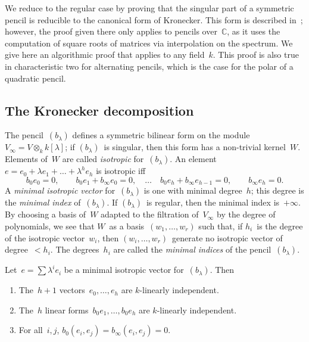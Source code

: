 \documentclass{article}%
\begin{document}
We reduce to the regular case by proving that the singular part of a
symmetric pencil is reducible to the canonical form of Kronecker. This
form is described in~\cite[XII(56)]{Gantmacher}; however, the proof
given there only applies to pencils over~$ℂ$, as it uses the computation
of square roots of matrices via interpolation on the spectrum. We give
here an algorithmic proof that applies to any field~$k$. This proof is
also true in characteristic two for alternating pencils, which is the
case for the polar of a quadratic pencil.

\subsection{The Kronecker decomposition} %
\label{SS:Kronecker-reduction}
The pencil~$(b_{λ})$ defines a symmetric bilinear form on the
module~$V_{∞} = V ⊗_{k} k[λ]$; if $(b_{λ})$~is singular, then this form
has a non-trivial kernel~$W$. Elements of~$W$ are called \emph{isotropic}
for~$(b_{λ})$. An element~$e = e_0 + λ e_1 + … + λ^h e_h$ is isotropic iff
\begin{equation}\label{eq:isotropic}
b_0 e_0 = 0, \qquad
b_0 e_1 + b_{∞} e_0 = 0, \quad … \quad
b_0 e_h + b_{∞} e_{h-1} = 0, \qquad
b_{∞} e_{h} = 0.
\end{equation}
A \emph{minimal isotropic vector} for~$(b_{λ})$ is one with minimal
degree~$h$; this degree is the \emph{minimal index} of~$(b_{λ})$. If
$(b_{λ})$~is regular, then the minimal index is~$+∞$.
By choosing a basis of~$W$
adapted to the filtration of~$V_{∞}$ by the degree of polynomials, we see
that $W$~as a basis~$(w_1,…,w_r)$ such that, if $h_i$~is the degree of
the isotropic vector~$w_i$, then $(w_i,…,w_r)$~generate no isotropic
vector of degree~$< h_i$. The degrees~$h_i$ are called the \emph{minimal
indices} of the pencil~$(b_{λ})$.
\begin{prop}\label{prop:minimal-indep}%
Let~$e = ∑ λ^i e_i$ be a minimal isotropic vector for~$(b_{λ})$. Then
\begin{enumerate}
\item The~$h+1$ vectors~$e_0, …, e_h$ are $k$-linearly independent.
\item The~$h$ linear forms~$b_{0} e_1, …, b_{0} e_h$ are $k$-linearly
independent.
\item For all~$i, j$, $b_{0}(e_i, e_j) = b_{∞}(e_i, e_j) = 0$.
\end{enumerate}
\end{prop}
\end{document}
